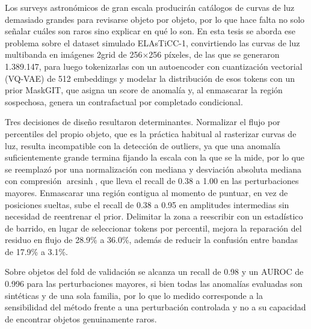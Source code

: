 \documentclass[
	spanish, %
	letterpaper, oneside
]{book}
\begin{document}
\templatePortrait

\templatePagecfg

\begin{abstractd}
	Los surveys astronómicos de gran escala producirán catálogos de curvas de luz
	demasiado grandes para revisarse objeto por objeto, por lo que hace falta no
	solo señalar cuáles son raros sino explicar en qué lo son. En esta tesis se
	aborda ese problema sobre el dataset simulado ELAsTiCC-1, convirtiendo las
	curvas de luz multibanda en imágenes 2grid de 256$\times$256 píxeles, de las
	que se generaron 1.389.147, para luego tokenizarlas con un autoencoder con
	cuantización vectorial (VQ-VAE) de 512 embeddings y modelar la distribución de
	esos tokens con un prior MaskGIT, que asigna un score de anomalía y, al
	enmascarar la región sospechosa, genera un contrafactual por completado
	condicional.

	Tres decisiones de diseño resultaron determinantes. Normalizar el flujo por
	percentiles del propio objeto, que es la práctica habitual al rasterizar curvas
	de luz, resulta incompatible con la detección de outliers, ya que una anomalía
	suficientemente grande termina fijando la escala con la que se la mide, por lo
	que se reemplazó por una normalización con mediana y desviación absoluta
	mediana con compresión $\operatorname{arcsinh}$, que lleva el recall de 0.38 a
	1.00 en las perturbaciones mayores. Enmascarar una región contigua al momento
	de puntuar, en vez de posiciones sueltas, sube el recall de 0.38 a 0.95 en
	amplitudes intermedias sin necesidad de reentrenar el prior. Delimitar la zona
	a reescribir con un estadístico de barrido, en lugar de seleccionar tokens por
	percentil, mejora la reparación del residuo en flujo de 28.9\% a 36.0\%, además
	de reducir la confusión entre bandas de 17.9\% a 3.1\%.

	Sobre objetos del fold de validación se alcanza un recall de 0.98 y un AUROC de
	0.996 para las perturbaciones mayores, si bien todas las anomalías evaluadas son
	sintéticas y de una sola familia, por lo que lo medido corresponde a la
	sensibilidad del método frente a una perturbación controlada y no a su capacidad
	de encontrar objetos genuinamente raros.
\end{abstractd}

\begin{dedicatory}
\end{dedicatory}
\end{document}
